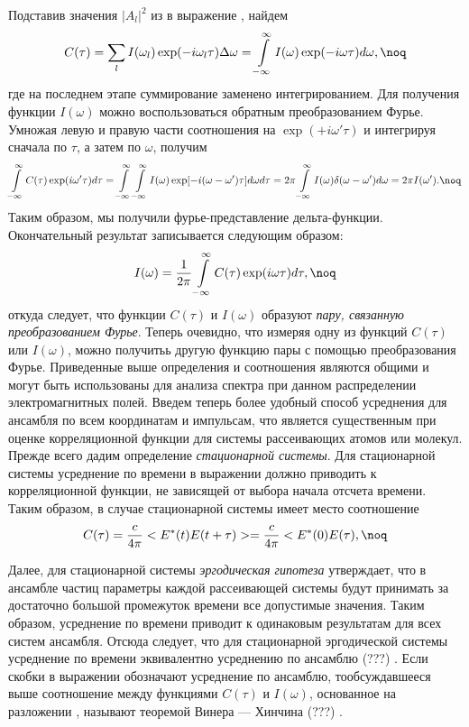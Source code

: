 Подставив значения $|A_l|^2$ из  в выражение ,
найдем
$$C(\tau)=\sum\limits_{l}I(\omega_l)\exp(-i\omega_l\tau)\Delta
\omega=\int\limits_{-\infty}^{\infty}I(\omega)\exp(-i\omega\tau)d\omega,\noq$$
где на последнем этапе суммирование заменено интегрированием.
Для получения функции $I(\omega)$ можно воспользоваться обратным
преобразованием Фурье. Умножая левую и правую части соотношения
 на $\exp(+i\omega'\tau)$ и интегрируя сначала по $\tau$, а
затем по $\omega$, получим
$$\int\limits_{-\infty}^{\infty}C(\tau)\exp(i\omega'\tau)d\tau=
\int\limits_{-\infty}^{\infty}\int\limits_{-\infty}^{\infty}I(\omega)
\exp[-i(\omega-\omega')\tau]d\omega d\tau=2\pi\int\limits_{-\infty}^{\infty}I(\omega)
\delta(\omega-\omega')d\omega=2\pi I(\omega').\noq$$
Таким образом, мы получили фурье-представление дельта-функции.
Окончательный результат записывается следующим образом:
$$I(\omega)={1\over2\pi}\int\limits_{-\infty}^{\infty}C(\tau)\exp(i\omega\tau)d\tau,\noq$$
откуда следует, что функции $C(\tau)$ и $I(\omega)$ образуют {\it
пару, связанную преобразованием Фурье}. Теперь очевидно, что
измеряя одну из функций $C(\tau)$ или $I(\omega)$, можно получитьь
другую функцию пары с помощью преобразования Фурье.
Приведенные выше определения и соотношения являются общими и
могут быть использованы для анализа спектра при данном
распределении электромагнитных полей. Введем теперь более удобный
способ усреднения для ансамбля по всем координатам и импульсам,
что является существенным при оценке корреляционной функции для
системы рассеивающих атомов или молекул. Прежде всего дадим
определение {\it стационарной системы}. Для стационарной системы
усреднение по времени в выражении  должно приводить к
корреляционной функции, не зависящей от выбора начала отсчета
времени. Таким образом, в случае стационарной системы имеет место
соотношение
$$C(\tau)={c\over4\pi}<E^*(t)E(t+\tau)>={c\over4\pi}<E^*(0)E(\tau),\noq$$

Далее, для стационарной системы {\it эргодическая гипотеза}
утверждает, что в ансамбле частиц параметры каждой рассеивающей
системы будут принимать за достаточно большой промежуток времени
все допустимые значения. Таким образом, усреднение по времени
приводит к одинаковым результатам для всех систем ансамбля.
Отсюда следует, что для стационарной эргодической системы
усреднение по времени эквивалентно усреднению по ансамблю  (???) .
Если скобки в выражении  обозначают усреднение по
ансамблю, тообсуждавшееся выше соотношение между функциями
$C(\tau)$ и $I(\omega)$, основанное на разложении , называют
теоремой Винера --- Хинчина  (???) .

